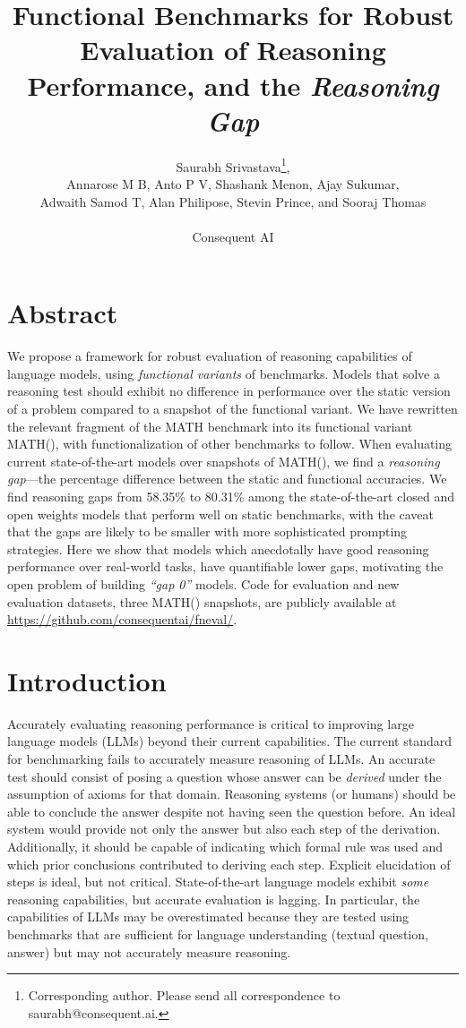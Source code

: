 \documentclass[11pt,a4paper]{article}
\title{
  Functional Benchmarks for Robust Evaluation of Reasoning Performance, and the
  {\em Reasoning Gap}
}
\author{Saurabh Srivastava\footnote{Corresponding author. Please send all correspondence to saurabh@consequent.ai.},\\
Annarose M B,
Anto P V,
Shashank Menon, Ajay Sukumar,\\
Adwaith Samod T,
Alan Philipose,
Stevin Prince, and
Sooraj Thomas\\\\
Consequent AI
}
\date{}
\begin{document}
\maketitle



\section{Abstract} We propose a framework for robust evaluation of reasoning
capabilities of language models, using {\em functional variants} of benchmarks.
Models that solve a reasoning test should exhibit no difference in performance
over the static version of a problem compared to a snapshot of the functional
variant. We have rewritten the relevant fragment of the MATH benchmark into its
functional variant MATH(), with functionalization of other benchmarks to
follow.  When evaluating current state-of-the-art models over snapshots of
MATH(), we find a {\em reasoning gap}---the percentage difference between the
static and functional accuracies. We find reasoning gaps from 58.35\% to
80.31\% among the state-of-the-art closed and open weights models that perform
well on static benchmarks, with the caveat that the gaps are likely to be
smaller with more sophisticated prompting strategies. Here we show that models
which anecdotally have good reasoning performance over real-world tasks, have
quantifiable lower gaps, motivating the open problem of building {\em ``gap
0''} models. Code for evaluation and new evaluation datasets, three MATH()
snapshots, are publicly available at
\url{https://github.com/consequentai/fneval/}.



\section{Introduction}

Accurately evaluating reasoning performance is critical to improving large
language models (LLMs) beyond their current capabilities. The current standard
for benchmarking fails to accurately measure reasoning of LLMs. An accurate
test should consist of posing a question whose answer can be {\em derived} under the
assumption of axioms for that domain. Reasoning systems (or humans) should be
able to conclude the answer despite not having seen the question before. An
ideal system would provide not only the answer but also each step of the
derivation. Additionally, it should be capable of indicating which formal rule
was used and which prior conclusions contributed to deriving each step.
Explicit elucidation of steps is ideal, but not critical. State-of-the-art
language models exhibit {\em some} reasoning capabilities, but accurate evaluation is
lagging. In particular, the capabilities of LLMs  may be overestimated because
they are tested using benchmarks that are sufficient for language understanding
(textual question, answer) but may not accurately measure reasoning.
\end{document}

